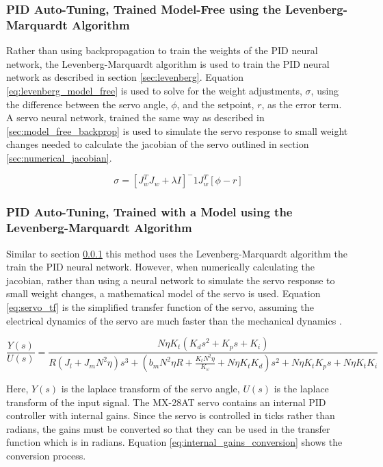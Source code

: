 \documentclass[letterpaper,12pt]{article}
\begin{document}
\subsubsection{PID Auto-Tuning, Trained Model-Free using the Levenberg-Marquardt Algorithm}\label{sec:levenberg_model_free}
Rather than using backpropagation to train the weights of the PID neural network, the Levenberg-Marquardt algorithm is used to train the PID neural network as described in section \ref{sec:levenberg}. Equation \ref{eq:levenberg_model_free} is used to solve for the weight adjustments, $\sigma$, using the difference between the servo angle, $\phi$, and the setpoint, $r$, as the error term. A servo neural network, trained the same way as described in \ref{sec:model_free_backprop} is used to simulate the servo response to small weight changes needed to calculate the jacobian of the servo outlined in section \ref{sec:numerical_jacobian}.

\begin{equation}
	\label{eq:levenberg_model_free}
	\sigma = [J_w^T J_w + \lambda I]^-1 J_w^T [\phi - r]
\end{equation}

\subsubsection{PID Auto-Tuning, Trained with a Model using the Levenberg-Marquardt Algorithm}
Similar to section \ref{sec:levenberg_model_free} this method uses the Levenberg-Marquardt algorithm the train the PID neural network. However, when numerically calculating the jacobian, rather than using a neural network to simulate the servo response to small weight changes, a mathematical model of the servo is used. Equation \ref{eq:servo_tf} is the simplified transfer function of the servo, assuming the electrical dynamics of the servo are much faster than the mechanical dynamics \cite{m.r.o.a.maximo}.

\begin{equation}
	\label{eq:servo_tf}
	\frac{Y(s)}{U(s)} = \frac{N \eta K_t (K_d s^2 + K_p s + K_i)}{R (J_l + J_m N^2 \eta)s^3 + (b_m N^2 \eta R + \frac{K_t N^2 \eta}{K_\omega} + N \eta K_t K_d)s^2 + N \eta K_t K_p s + N \eta K_t K_i}
\end{equation}

Here, $Y(s)$ is the laplace transform of the servo angle, $U(s)$ is the laplace transform of the input signal.
The MX-28AT servo contains an internal PID controller with internal gains. Since the servo is controlled in ticks rather than radians, the gains must be converted so that they can be used in the transfer function which is in radians. Equation \ref{eq:internal_gains_conversion} shows the conversion process.
\end{document}
